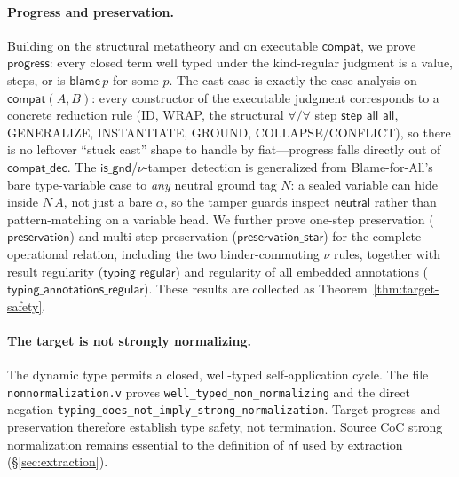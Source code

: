 \documentclass[acmsmall,anonymous=false,nonacm]{acmart}
\newcommand{\blame}[1]{\mathsf{blame}\,#1}
\newcommand{\nf}{\mathsf{nf}}
\begin{document}
\paragraph{Progress and preservation.}
Building on the structural metatheory and on executable $\mathsf{compat}$, we
prove $\mathsf{progress}$: every closed term well typed under the kind-regular
judgment is a value, steps, or is $\blame p$ for some $p$. The cast case is
exactly the case analysis on $\mathsf{compat}(A,B)$: every constructor of the
executable judgment corresponds to a concrete reduction rule (ID, WRAP, the
structural $\forall/\forall$ step $\mathsf{step\_all\_all}$, GENERALIZE,
INSTANTIATE, GROUND, COLLAPSE/CONFLICT), so there is no leftover ``stuck
cast'' shape to handle by fiat---progress falls directly out of
$\mathsf{compat\_dec}$. The $\mathsf{is\_gnd}$/$\nu$-tamper detection is
generalized from Blame-for-All's bare type-variable case to \emph{any} neutral
ground tag $N$: a sealed variable can hide inside $N\,A$, not just a bare
$\alpha$, so the tamper guards inspect $\mathsf{neutral}$ rather than
pattern-matching on a variable head. We further prove one-step preservation
($\mathsf{preservation}$) and multi-step preservation
($\mathsf{preservation\_star}$) for the complete operational relation,
including the two binder-commuting $\nu$ rules, together with result
regularity ($\mathsf{typing\_regular}$) and regularity of all embedded
annotations ($\mathsf{typing\_annotations\_regular}$). These results are
collected as Theorem~\ref{thm:target-safety}.

\paragraph{The target is not strongly normalizing.}
The dynamic type permits a closed, well-typed self-application cycle. The file
\texttt{nonnormalization.v} proves \texttt{well\_typed\_non\_normalizing} and
the direct negation
\texttt{typing\_does\_not\_imply\_strong\_normalization}. Target progress and
preservation therefore establish type safety, not termination. Source CoC
strong normalization remains essential to the definition of $\nf$ used by
extraction (\S\ref{sec:extraction}).
\end{document}
